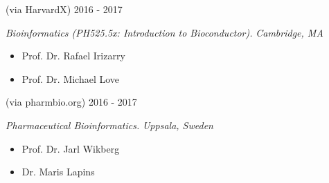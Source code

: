  (via HarvardX) \hfill 2016 - 2017

\emph{Bioinformatics (PH525.5x: Introduction to Bioconductor).} \hfill \emph{Cambridge, MA}
\vspace{-10pt}
\begin{itemize}[noitemsep, leftmargin=.5cm, label={\tiny\raisebox{.5ex}{\textbullet}}]
\item Prof. Dr. Rafael Irizarry
\item Prof. Dr. Michael Love
\end{itemize}

 (via pharmbio.org) \hfill 2016 - 2017

\emph{Pharmaceutical Bioinformatics.} \hfill \emph{Uppsala, Sweden}
\vspace{-10pt}
\begin{itemize}[noitemsep, leftmargin=.5cm, label={\tiny\raisebox{.5ex}{\textbullet}}]
\item Prof. Dr. Jarl Wikberg
\item Dr. Maris Lapins
\end{itemize}

